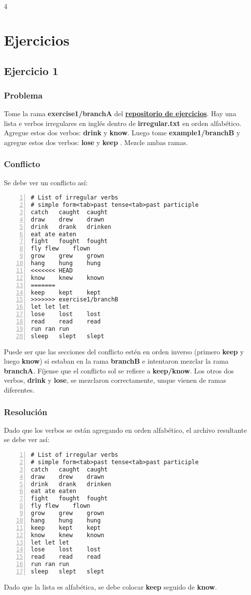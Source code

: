 4 %

\chapter{Ejercicios}

\section{Ejercicio 1}
\label{exercise_01}
\subsection*{Problema}
Tome la rama {\bf exercise1/branchA } del \hyperref[exercises_repo]{\bf repositorio de ejercicios}. Hay una lista
e verbos irregulares en inglés dentro de {\bf irregular.txt} en orden alfabético. Agregue estos dos verbos: {\bf drink} y {\bf know}.
Luego tome {\bf example1/branchB } y agregue estos dos verbos: {\bf lose } y {\bf keep }. Mezcle ambas ramas.

\subsection*{Conflicto}
Se debe ver un conflicto así:
\begin{lstlisting}[style=console_style, numbers=left, caption={\bf Ejercicio 1} - conflicto]
# List of irregular verbs
# simple form<tab>past tense<tab>past participle
catch	caught	caught
draw	drew	drawn
drink	drank	drinken
eat	ate	eaten
fight	fought	fought
fly	flew	flown
grow	grew	grown
hang	hung	hung
<<<<<<< HEAD
know	knew	known
=======
keep	kept	kept
>>>>>>> exercise1/branchB
let	let	let
lose	lost	lost
read	read	read
run	ran	run
sleep	slept	slept
\end{lstlisting}

Puede ser que las secciones del conflicto estén en orden inverso (primero {\bf keep} y luego {\bf know}) si estaban en la rama
{\bf branchB} e intentaron mezclar la rama {\bf branchA}. Fíjense que el conflicto sol se refiere a {\bf keep/know}. Los otros dos verbos,
{\bf drink} y {\bf lose}, se mezclaron correctamente, unque vienen de ramas diferentes.

\subsection*{Resolución}
Dado que los verbos se están agregando en orden alfabético, el archivo resultante se debe ver así:
\begin{lstlisting}[style=console_style, numbers=left, caption={\bf Ejercicio 1} - Resolución]
# List of irregular verbs
# simple form<tab>past tense<tab>past participle
catch	caught	caught
draw	drew	drawn
drink	drank	drinken
eat	ate	eaten
fight	fought	fought
fly	flew	flown
grow	grew	grown
hang	hung	hung
keep	kept	kept
know	knew	known
let	let	let
lose	lost	lost
read	read	read
run	ran	run
sleep	slept	slept
\end{lstlisting}
Dado que la lista es alfabética, se debe colocar {\bf keep} seguido de {\bf know}.


